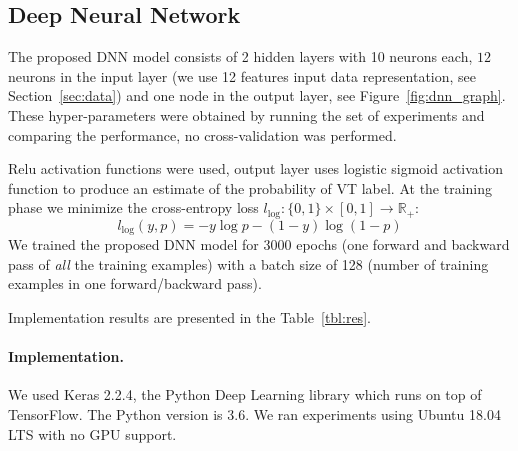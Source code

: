 \subsection{Deep Neural Network}
\label{sec:dnn}

The proposed DNN model consists of 2 hidden layers with 10 neurons 
each, $12$ 
neurons in the input layer (we use 12 features input data 
representation, see Section~\ref{sec:data}) and one node in the 
output layer, see 
Figure~\ref{fig:dnn_graph}. These hyper-parameters were obtained by 
running the set of experiments and comparing the performance, no 
cross-validation was performed.  

Relu activation functions were used, output layer uses logistic 
sigmoid activation function to produce an estimate of the probability 
of VT label.
At the training phase we minimize the cross-entropy loss 
$l_{\log}:\{0,1\}\times[0,1]\rightarrow\mathbb{R}_{+}$:
\begin{equation}
l_{\log}(y,p)= -y\log p - (1-y)\log(1-p)
\end{equation}
We trained the proposed DNN model for 3000 epochs (one forward and 
backward pass of \textit{all} the training examples) with a batch 
size of 128 (number of training examples in one forward/backward 
pass). 

Implementation results are presented in the Table~\ref{tbl:res}.
\paragraph{Implementation.}
We used Keras 2.2.4, the Python Deep Learning library which runs on 
top of TensorFlow. The Python version is 3.6.
We ran experiments using Ubuntu 18.04 LTS with no GPU support.

